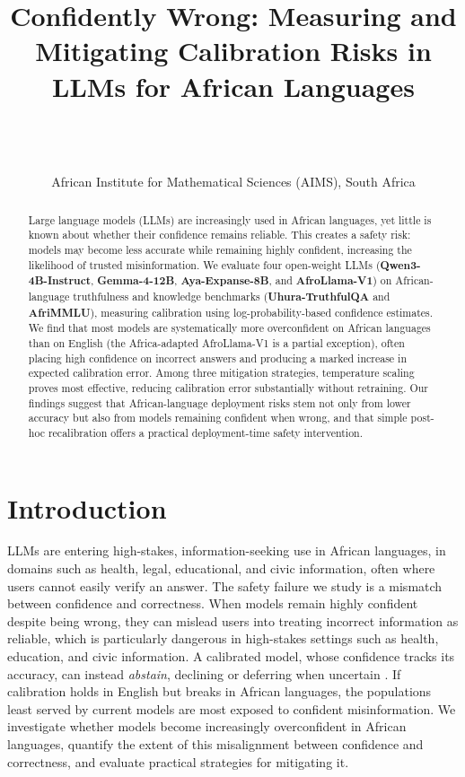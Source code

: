 \documentclass[pmlr]{jmlr}%
\title[Confidently Wrong: Calibration Risks in LLMs for African Languages]{Confidently Wrong: Measuring and Mitigating Calibration Risks in LLMs for African Languages}
\author{%
  \Name{Similoluwa Okunowo} \Email{similoluwa@aims.ac.za}\\
  \Name{Eliud Koto} \Email{eliud@aims.ac.za}\\
  \Name{Dagmawi Misker} \Email{dagmawi@aims.ac.za}\\
  \addr African Institute for Mathematical Sciences (AIMS), South Africa
}
\begin{document}
\maketitle
\thispagestyle{jmlrtps}%
\pagestyle{plain}%
\vspace{-2.2em}%

\begin{abstract}
Large language models (LLMs) are increasingly used in African languages, yet little is known about
whether their confidence remains reliable. This creates a safety risk: models may become less
accurate while remaining highly confident, increasing the likelihood of trusted misinformation. We
evaluate four open-weight LLMs (\textbf{Qwen3-4B-Instruct}, \textbf{Gemma-4-12B},
\textbf{Aya-Expanse-8B}, and \textbf{AfroLlama-V1}) on African-language truthfulness and knowledge
benchmarks (\textbf{Uhura-TruthfulQA} and \textbf{AfriMMLU}), measuring calibration using
log-probability-based confidence estimates. We find that most models are systematically more
overconfident on African languages than on English (the Africa-adapted AfroLlama-V1 is a partial
exception), often placing high confidence on incorrect answers and producing a marked increase in
expected calibration error. Among three mitigation
strategies, temperature scaling proves most effective, reducing calibration error substantially
without retraining. Our findings suggest that African-language deployment risks stem not only
from lower accuracy but also from models remaining confident when wrong, and that simple post-hoc
recalibration offers a practical deployment-time safety intervention.
\end{abstract}

\section{Introduction}
LLMs are entering high-stakes, information-seeking use in African languages, in domains such as
health, legal, educational, and civic information, often where users cannot easily verify an answer. The safety
failure we study is a mismatch between confidence and correctness. When models remain highly
confident despite being wrong, they can mislead users into treating incorrect information as
reliable, which is particularly dangerous in high-stakes settings such as health, education, and
civic information. A calibrated model, whose confidence tracks its accuracy, can instead
\emph{abstain}, declining or deferring when uncertain \citep{tomani2024}. If calibration holds in
English but breaks in African languages, the populations least served by current models are most
exposed to confident misinformation. We investigate whether models become increasingly overconfident
in African languages, quantify the extent of this misalignment between confidence and correctness,
and evaluate practical strategies for mitigating it.
\end{document}
